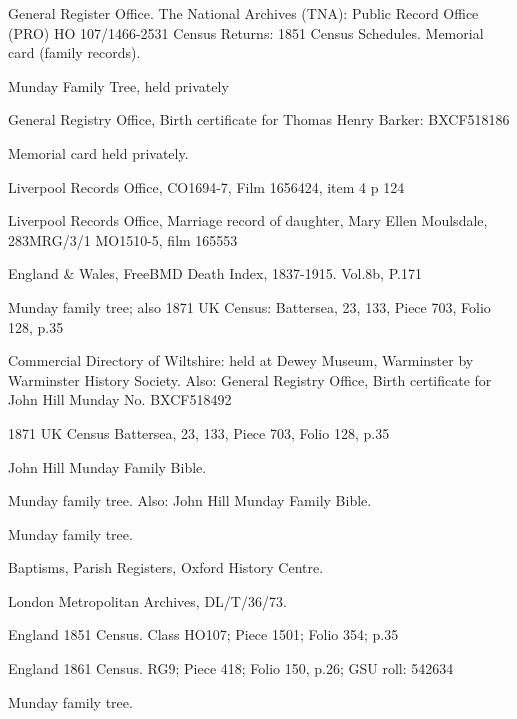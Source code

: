 \begin{thebibliography}{99}
	General Register Office. The National Archives (TNA): Public Record Office (PRO) HO 107/1466-2531 Census Returns: 1851 Census Schedules.
	Memorial card (family records). 
	
	Munday Family Tree, held privately

	 General Registry Office, Birth certificate for Thomas Henry Barker: BXCF518186
	 
	 Memorial card held privately.
	 
	Liverpool Records Office, CO1694-7, Film 1656424, item 4 p 124

	Liverpool Records Office, Marriage record of daughter, Mary Ellen Moulsdale, 283MRG/3/1 MO1510-5, film 165553

	England & Wales, FreeBMD Death Index, 1837-1915. Vol.8b, P.171
	
	Munday family tree; also
	1871 UK Census: Battersea, 23, 133, Piece 703, Folio 128, p.35 
	
	Commercial Directory of Wiltshire: held at Dewey Museum, Warminster by Warminster History Society.
	Also: General Registry Office, Birth certificate for John Hill Munday No. BXCF518492
	
	1871 UK Census
	Battersea, 23, 133, Piece 703, Folio 128, p.35
	
	John Hill Munday Family Bible.
	
	Munday family tree. Also:
	John Hill Munday Family Bible. 
	
	Munday family tree. 
	
	 Baptisms, Parish Registers, Oxford History Centre.
	 
	 London Metropolitan Archives, DL/T/36/73. 
	 
	England 1851 Census.
	Class HO107; Piece 1501; Folio 354; p.35
	
	England 1861 Census.
	RG9; Piece 418; Folio 150, p.26; GSU roll: 542634
	
	Munday family tree.
	

\end{thebibliography}
